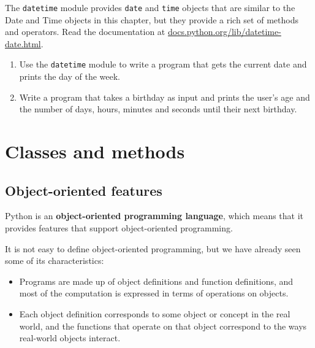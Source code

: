 \documentclass[10pt]{book}
\begin{document}
{\begin{ex}


The {\tt datetime} module provides {\tt date} and {\tt time} objects
that are similar to the Date and Time objects in this chapter, but
they provide a rich set of methods and operators.  Read the
documentation at \url{docs.python.org/lib/datetime-date.html}.

\begin{enumerate}

\item Use the {\tt datetime} module to write a program that
gets the current date and prints the day of the week.


\item Write a program that takes a birthday as input
and prints the user's age and the number of days, hours,
minutes and seconds until their next birthday.
\end{enumerate}

\end{ex}


\chapter{Classes and methods}


\section{Object-oriented features}


Python is an {\bf object-oriented programming language}, which means
that it provides features that support object-oriented
programming.

It is not easy to define object-oriented programming, but we have
already seen some of its characteristics:

\begin{itemize}

\item Programs are made up of object definitions and function
definitions, and most of the computation is expressed in terms
of operations on objects.

\item Each object definition corresponds to some object or concept
in the real world, and the functions that operate on that object
correspond to the ways real-world objects interact.


\end{itemize}}
\end{document}
